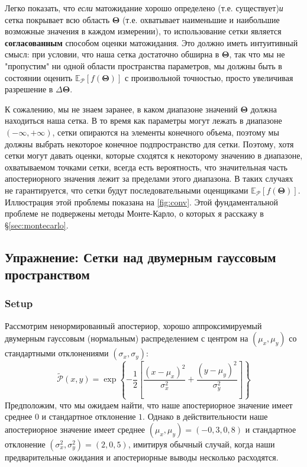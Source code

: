 \documentclass[12pt, titlepage]{article}
\newcommand{\meanwrt}[2]{\ensuremath{\mathbb{E}_{{#2}}\left[{#1}\right]}}
\newcommand{\params}{\ensuremath{\boldsymbol\Theta}}
\newcommand{\posterior}{\ensuremath{\mathcal{P}}}
\begin{document}
Легко показать, что \textit{если} матожидание хорошо определено (т.е. существует)\textit{и} сетка покрывает всю область $\params$ (т.е. охватывает наименьшие и наибольшие возможные значения в каждом измерении), то использование сетки является \textbf{согласованным} способом оценки матожидания. Это должно иметь интуитивный смысл: при условии, что наша сетка достаточно обширна в $\params$, так что мы не "пропустим" ни одной области пространства параметров, мы должны быть в состоянии оценить $\meanwrt{f(\params)}{\posterior}$ с произвольной точностью, просто увеличивая разрешение в $\Delta \params$.

К сожалению, мы не знаем заранее, в каком диапазоне значений $\params$ должна находиться наша сетка. В то время как параметры могут лежать в диапазоне $(-\infty, +\infty)$, сетки опираются на элементы конечного объема, поэтому мы должны выбрать некоторое конечное подпространство для сетки. Поэтому, хотя сетки могут давать оценки, которые сходятся к некоторому значению в диапазоне, охватываемом точками сетки, всегда есть вероятность, что значительная часть апостериорного значения лежит за пределами этого диапазона. В таких случаях не гарантируется, что сетки будут последовательными оценщиками $\meanwrt{f(\params)}{\posterior}$. Иллюстрация этой проблемы показана на {\color{red} \autoref{fig:conv}}. Этой фундаментальной проблеме не подвержены методы Монте-Карло, о которых я расскажу в \S\ref{sec:montecarlo}.

\subsection*{Упражнение: Сетки над двумерным гауссовым пространством} \label{exercise:grids}

\subsubsection*{Setup}

Рассмотрим ненормированный апостериор, хорошо аппроксимируемый двумерным гауссовым (нормальным) распределением с центром на $(\mu_x,\mu_y)$ со стандартными отклонениями $(\sigma_x, \sigma_y)$:
\begin{equation*}
    \tilde{\posterior}(x,y) 
    = \exp\left\{-\frac{1}{2}\left[\frac{(x-\mu_x)^2}{\sigma_x^2}
    + \frac{(y-\mu_y)^2}{\sigma_y^2}\right]\right\}
\end{equation*}
Предположим, что мы ожидаем найти, что наше апостериорное значение имеет среднее $0$ и стандартное отклонение $1$. Однако в действительности наше апостериорное значение имеет среднее $(\mu_x,\mu_y)=(-0,3,0,8)$ и стандартное отклонение $(\sigma_x^2,\sigma_y^2)=(2,0,5)$, имитируя обычный случай, когда наши предварительные ожидания и апостериорные выводы несколько расходятся.
\end{document}
